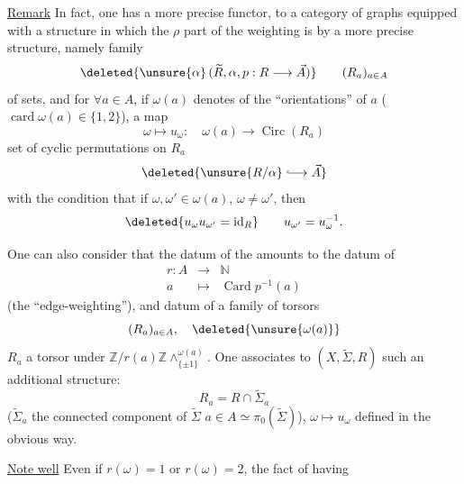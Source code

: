 \uline{Remark} In fact, one has a more precise functor, to a category of graphs equipped with a structure in which the $\rho$ part of the weighting is   by a more precise structure, namely   family
\[
 \deleted{\unsure{\alpha}\,(\widetilde R,\alpha,p:R\longrightarrow\vec A)}
 \qquad (R_a)_{a\in A}
\]
of sets, and for $\forall a\in A$, if $\omega(a)$ denotes  of the
``orientations'' of $a$ ($\operatorname{card}\omega(a)\in\{1,2\}$), a map
\[
 \omega\longmapsto u_\omega:\quad \omega(a)\longrightarrow\operatorname{Circ}(R_a)
\]
set of cyclic permutations on $R_a$
\[
 \deleted{\unsure{R/\alpha}\lhook\joinrel\longrightarrow\vec A}
\]
with the condition that if $\omega,\omega'\in\omega(a)$, $\omega\ne\omega'$, then
\[
 \deleted{u_\omega u_{\omega'}=\operatorname{id}_R}
 \qquad u_{\omega'}=u_\omega^{-1}.
\]

One can also consider that the datum of the  amounts to the datum of
\[
 \begin{array}{rcl}
 r:A&\longrightarrow&\mathbb N\\
 a&\longmapsto&\operatorname{Card}p^{-1}(a)
 \end{array}
\]
(the ``edge-weighting''), and  datum of a family of torsors
\[
 (R_a)_{a\in A},\quad \deleted{\unsure{\omega(a)}}
\]
$R_a$ a torsor under $\mathbb Z/r(a)\mathbb Z\mathbin{\wedge}^{\omega(a)}_{\{\pm1\}}$.
One associates to $(X,\widetilde\Sigma,R)$ such an additional structure:
\[
 R_a=R\cap\widetilde\Sigma_a
\]
($\widetilde\Sigma_a$ the connected component of $\widetilde\Sigma$   $a\in A\simeq\pi_0(\widetilde\Sigma)$),
$\omega\longmapsto u_\omega$ defined in the obvious way.

\uline{Note well} Even if $r(\omega)=1$ or $r(\omega)=2$, the fact of having
